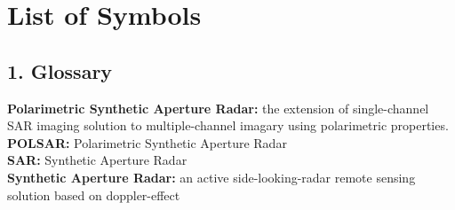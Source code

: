 \documentclass[a4paper, oneside, 11pt]{Latex/Classes/PhDthesisPSnPDF}
\begin{document}
{}
\tableofcontents            %


% 
%
%
%

\chapter*{List of Symbols}

\section*{1. Glossary}

\begin{multicols}{2}
  


{\bf Polarimetric Synthetic Aperture Radar:} the extension of single-channel SAR imaging solution to multiple-channel imagary using polarimetric properties.\\

{\bf POLSAR:} Polarimetric Synthetic Aperture Radar \\

{\bf SAR:} Synthetic Aperture Radar\\

{\bf Synthetic Aperture Radar:} an active side-looking-radar remote sensing solution based on doppler-effect\\

\label{glossary} %

\end{multicols}
\end{document}
